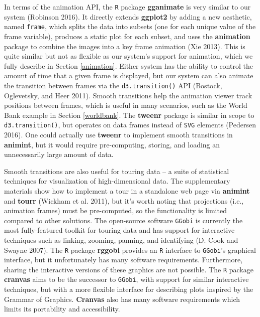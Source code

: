 \documentclass[12pt,]{article}
\theoremstyle{definition}
\theoremstyle{definition}
\theoremstyle{definition}
\theoremstyle{remark}
\begin{document}
In terms of the animation API, the \texttt{R} package \textbf{gganimate}
is very similar to our system (Robinson 2016). It directly extends
\textbf{ggplot2} by adding a new aesthetic, named \texttt{frame}, which
splits the data into subsets (one for each unique value of the frame
variable), produces a static plot for each subset, and uses the
\textbf{animation} package to combine the images into a key frame
animation (Xie 2013). This is quite similar but not as flexible as our
system's support for animation, which we fully describe in Section
\ref{animation}. Either system has the ability to control the amount of
time that a given frame is displayed, but our system can also animate
the transition between frames via the \texttt{d3.transition()} API
(Bostock, Oglevetsky, and Heer 2011). Smooth transitions help the
animation viewer track positions between frames, which is useful in many
scenarios, such as the World Bank example in Section \ref{worldbank}.
The \textbf{tweenr} package is similar in scope to
\texttt{d3.transition()}, but operates on data frames instead of
\texttt{SVG} elements (Pedersen 2016). One could actually use
\textbf{tweenr} to implement smooth transitions in \textbf{animint}, but
it would require pre-computing, storing, and loading an unnecessarily
large amount of data.

Smooth transitions are also useful for touring data -- a suite of
statistical techniques for visualization of high-dimensional data. The
supplementary materials show how to implement a tour in a standalone web
page via \textbf{animint} and \textbf{tourr} (Wickham et al. 2011), but
it's worth noting that projections (i.e., animation frames) must be
pre-computed, so the functionality is limited compared to other
solutions. The open-source software \texttt{GGobi} is currently the most
fully-featured toolkit for touring data and has support for interactive
techniques such as linking, zooming, panning, and identifying (D. Cook
and Swayne 2007). The \texttt{R} package \textbf{rggobi} provides an
\texttt{R} interface to \texttt{GGobi}'s graphical interface, but it
unfortunately has many software requirements. Furthermore, sharing the
interactive versions of these graphics are not possible. The \texttt{R}
package \textbf{cranvas} aims to be the successor to \texttt{GGobi},
with support for similar interactive techniques, but with a more
flexible interface for describing plots inspired by the Grammar of
Graphics. \textbf{Cranvas} also has many software requirements which
limits its portability and accessibility.
\end{document}
